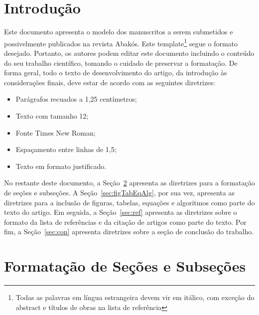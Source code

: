 \documentclass[a4paper,12pt]{article}
\begin{document}

\revistaheader
\newpage

 \onehalfspace  %
 \setlength{\parindent}{1.25cm}


\section{Introdução}

Este documento apresenta o modelo dos manuscritos a serem submetidos e possivelmente publicados na revista Abakós. Este template\footnote{Todas as palavras em língua estrangeira devem vir em itálico, com exceção do abstract e títulos de obras na lista de referência} segue o formato desejado. Portanto, os autores podem editar este documento incluindo o conteúdo do seu trabalho científico, tomando o cuidado de preservar a formatação.
De forma geral, todo o texto de desenvolvimento do artigo, da introdução às considerações finais, deve estar de acordo com as seguintes diretrizes:
\begin{itemize}
    \item Parágrafos recuados a 1,25 centímetros;
    \item Texto com tamanho 12;
    \item Fonte Times New Roman;
    \item Espaçamento entre linhas de 1,5;
    \item Texto em formato justificado.
\end{itemize}

No restante deste documento, a Seção~\ref{sec:sec} apresenta as diretrizes para a formatação de seções e subseções. A Seção~\ref{sec:figTabEqAlg}, por sua vez, apresenta as diretrizes para a inclusão de figuras, tabelas, equações e algoritmos como parte do texto do artigo. Em seguida, a Seção~\ref{sec:ref} apresenta as diretrizes sobre o formato da lista de referências e da citação de artigos como parte do texto. Por fim, a Seção~\ref{sec:con} apresenta diretrizes sobre a seção de conclusão do trabalho.


\section{Formatação de Seções e Subseções}
\label{sec:sec}
\end{document}
